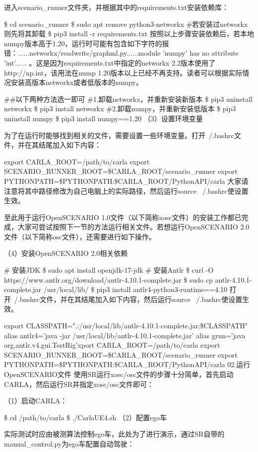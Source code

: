 进入scenario\_runner文件夹，并根据其中的requirements.txt安装依赖库：

\$ cd scenario\_runner
\$ sudo apt remove python3-networkx \#若安装过networkx则先将其卸载
\$ pip3 install -r requirements.txt
按照以上步骤安装依赖后，若本地numpy版本高于1.20，运行时可能有包含如下字符的报错：......networkx/readwrite/graphml.py......module 'numpy' has no attribute 'int'...... 。这是因为requirements.txt中指定的networkx 2.2版本使用了http://np.int，该用法在nump 1.20版本以上已经不再支持。读者可以根据实际情况安装高版本networkx或者低版本的numpy。

\#\#以下两种方法选一即可
\#1.卸载networkx，并重新安装新版本
\$ pip3 uninstall networkx
\$ pip3 install networkx
\#2.卸载numpy，并重新安装低版本
\$ pip3 uninstall numpy
\$ pip3 install numpy==1.20
（3）设置环境变量

为了在运行时能够找到相关的文件，需要设置一些环境变量。打开~/.bashrc文件，并在其结尾加入如下内容：

export CARLA\_ROOT=/path/to/carla
export SCENARIO\_RUNNER\_ROOT=\$CARLA\_ROOT/scenario\_runner
export PYTHONPATH=\$PYTHONPATH:\$CARLA\_ROOT/PythonAPI/carla
大家请注意将其中路径修改为自己电脑上的实际路径，然后运行source ~/.bashrc使设置生效。

至此用于运行OpenSCENARIO 1.0文件（以下简称xosc文件）的安装工作都已完成，大家可尝试按照下一节的方法运行相关文件。若想运行OpenSCENARIO 2.0文件（以下简称osc文件），还需要进行如下操作。

（4）安装OpenSCENARIO 2.0相关依赖

\# 安装JDK
\$ sudo apt install openjdk-17-jdk
\# 安装Antlr
\$ curl -O https://www.antlr.org/download/antlr-4.10.1-complete.jar
\$ sudo cp antlr-4.10.1-complete.jar /usr/local/lib/
\$ pip3 install antlr4-python3-runtime==4.10
打开~/.bashrc文件，并在其结尾加入如下内容，然后运行source ~/.bashrc使设置生效。

export CLASSPATH=".:/usr/local/lib/antlr-4.10.1-complete.jar:\$CLASSPATH"
alias antlr4='java -jar /usr/local/lib/antlr-4.10.1-complete.jar'
alias grun='java org.antlr.v4.gui.TestRig'xport CARLA\_ROOT=/path/to/carla
export SCENARIO\_RUNNER\_ROOT=\$CARLA\_ROOT/scenario\_runner
export PYTHONPATH=\$PYTHONPATH:\$CARLA\_ROOT/PythonAPI/carla
02.运行OpenSCENARIO文件
使用SR运行xosc/osc文件的步骤十分简单，首先启动CARLA，然后运行SR并指定xosc/osc文件即可：

（1）启动CARLA：

\$ cd /path/to/carla
\$ ./CarlaUE4.sh
（2）配置ego车

实际测试时应由被测算法控制ego车，此处为了进行演示，通过SR自带的manual\_control.py为ego车配置自动驾驶：

